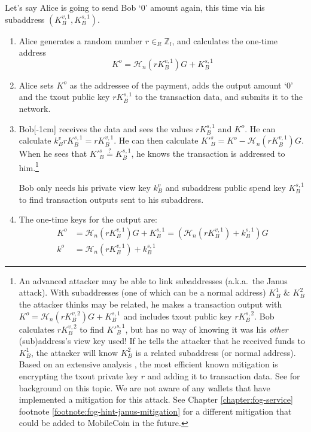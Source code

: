 Let's say Alice is going to send Bob `0' amount again, this time via his subaddress $(K_B^{v,1}, K_B^{s,1})$.
\begin{enumerate}
	\item Alice generates a random number $r \in_R \mathbb{Z}_l$, and calculates the one-time address\vspace{.175cm}
	\[ K^o  = \mathcal{H}_n(r K_B^{v,1})G + K_B^{s,1} \]

	\item Alice sets $K^o$ as the addressee of the payment, adds the output amount `0' and the txout public key $r K_B^{s,1}$ to the transaction data, and submits it to the network.

	\item Bob[-1cm] receives the data and sees the values $r K_B^{s,1}$ and $K^o$. He can calculate $k_B^v r K_B^{s,1} = r K_B^{v,1}$. He can then calculate $K'^{s}_B = K^o - \mathcal{H}_n(r K_B^{v,1})G$. When he sees that $K'^{s}_B \stackrel{?}{=} K^{s,1}_B$, he knows the transaction is addressed to him.\footnote{\label{footnote:janus-attack}An advanced attacker may be able to link subaddresses \cite{janus-attack} (a.k.a.\ the Janus attack). With subaddresses (one of which can be a normal address) $K_B^1$ $\&$ $K_B^2$ the attacker thinks may be related, he makes a transaction output with $K^o = \mathcal{H}_n(r K_B^{v,2})G + K_B^{s,1}$ and includes txout public key $r K_B^{s,2}$. Bob calculates $r K_B^{v,2}$ to find $K'^{s,1}_B$, but has no way of knowing it was his {\em other} (sub)address's view key used! If he tells the attacker that he received funds to $K_B^1$, the attacker will know $K_B^2$ is a related subaddress (or normal address). Based on an extensive analysis \cite{update-tx-supplement-proposal-monero}, the most efficient known mitigation is encrypting the txout private key $r$ and adding it to transaction data. See \cite{janus-mitigation-issue-62} for background on this topic. We are not aware of any wallets that have implemented a mitigation for this attack. See Chapter \ref{chapter:fog-service} footnote \ref{footnote:fog-hint-janus-mitigation} for a different mitigation that could be added to MobileCoin in the future.}

	Bob only needs his private view key $k_B^v$ and subaddress public spend key $K^{s,1}_B$ to find transaction outputs sent to his subaddress.

	\item The one-time keys for the output are:\vspace{.175cm}
	\begin{align*}
		K^o &= \mathcal{H}_n(r K_B^{v,1})G + K_B^{s,1} = (\mathcal{H}_n(r K_B^{v,1}) + k_B^{s,1})G  \\ 
		k^o &= \mathcal{H}_n(r K_B^{v,1}) + k_B^{s,1}
	\end{align*}
\end{enumerate}



